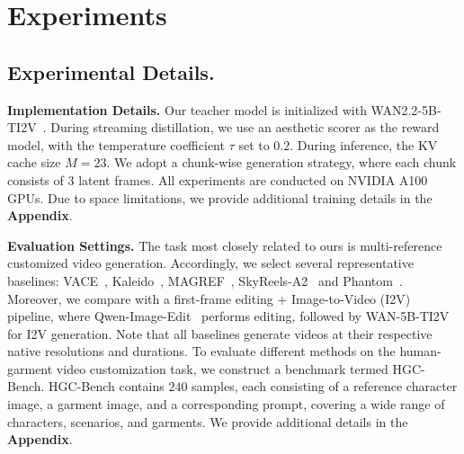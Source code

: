 \documentclass{llmxive}
\begin{document}
\section{Experiments}

\subsection{Experimental Details.}

\noindent
\textbf{Implementation Details.}
%
Our teacher model is initialized with WAN2.2-5B-TI2V~\cite{wan2025wan}.
During streaming distillation, we use an aesthetic scorer as the reward model, with the temperature coefficient $\tau$ set to $0.2$.
% 
During inference, the KV cache size $M=23$. We adopt a chunk-wise generation strategy, where each chunk consists of $3$ latent frames.
% 
All experiments are conducted on NVIDIA A100 GPUs.
% 
Due to space limitations, we provide additional training details in the \textbf{Appendix}.


\noindent
\textbf{Evaluation Settings.}
%
The task most closely related to ours is multi-reference customized video generation. Accordingly, we select several representative baselines: VACE~\cite{vace}, Kaleido~\cite{zhang2025kaleido}, MAGREF~\cite{deng2025magref}, SkyReels-A2~\cite{fei2025skyreels} and Phantom~\cite{liu2025phantom}.
% 
Moreover, we compare with a first-frame editing + Image-to-Video (I2V) pipeline, where Qwen-Image-Edit~\cite{wu2025qwen} performs editing, followed by WAN-5B-TI2V~\cite{wan2025wan} for I2V generation.
Note that all baselines generate videos at their respective native resolutions and durations.
%
To evaluate different methods on the human-garment video customization task, we construct a benchmark termed HGC-Bench.
HGC-Bench contains $240$ samples, each consisting of a reference character image, a garment image, and a corresponding prompt, covering a wide range of characters, scenarios, and garments. We provide additional details in the \textbf{Appendix}.
\end{document}
